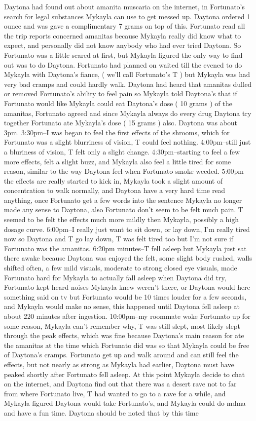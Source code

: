 \documentclass[12pt]{book}
\begin{document}
Daytona had found out about amanita muscaria on the internet, in Fortunato's search for legal substances Mykayla can use to get messed up. Daytona ordered 1 ounce and was gave a complimentary 7 grams on top of this. Fortunato read all the trip reports concerned amanitas because Mykayla really did know what to expect, and personally did not know anybody who had ever tried Daytona. So Fortunato was a little scared at first, but Mykayla figured the only way to find out was to do Daytona. Fortunato had planned on waited till the evened to do Mykayla with Daytona's fiance, ( we'll call Fortunato's T ) but Mykayla was had very bad cramps and could hardly walk. Daytona had heard that amanitas dulled or removed Fortunato's ability to feel pain so Mykayla told Daytona's that if Fortunato would like Mykayla could eat Daytona's dose ( 10 grams ) of the amanitas, Fortunato agreed and since Mykayla always do every drug Daytona try together Fortunato ate Mykayla's dose ( 15 grams ) also. Daytona was about 3pm. 3:30pm--I was began to feel the first effects of the shrooms, which for Fortunato was a slight blurriness of vision, T could feel nothing. 4:00pm--still just a bluriness of vision, T felt only a slight change. 4:30pm--starting to feel a few more effects, felt a slight buzz, and Mykayla also feel a little tired for some reason, similar to the way Daytona feel when Fortunato smoke weeded. 5:00pm--the effects are really started to kick in, Mykayla took a slight amount of concentration to walk normally, and Daytona have a very hard time read anything, once Fortunato get a few words into the sentence Mykayla no longer made any sense to Daytona, also Fortunato don't seem to be felt much pain. T seemed to be felt the effects much more mildly then Mykayla, possibly a high dosage curve. 6:00pm--I really just want to sit down, or lay down, I'm really tired now so Daytona and T go lay down, T was felt tired too but I'm not sure if Fortunato was the amanitas. 6:20pm minutes--T fell asleep but Mykayla just sat there awake because Daytona was enjoyed the felt, some slight body rushed, walls shifted often, a few mild visuals, moderate to strong closed eye visuals, made Fortunato hard for Mykayla to actually fall asleep when Daytona did try, Fortunato kept heard noises Mykayla knew weren't there, or Daytona would here something said on tv but Fortunato would be 10 times louder for a few seconds, and Mykayla would make no sense, this happened until Daytona fell asleep at about 220 minutes after ingestion. 10:00pm--my roommate woke Fortunato up for some reason, Mykayla can't remember why, T was still slept, most likely slept through the peak effects, which was fine because Daytona's main reason for ate the amanitas at the time which Fortunato did was so that Mykayla could be free of Daytona's cramps. Fortunato get up and walk around and can still feel the effects, but not nearly as strong as Mykayla had earlier, Daytona must have peaked shortly after Fortunato fell asleep. At this point Mykayla decide to chat on the internet, and Daytona find out that there was a desert rave not to far from where Fortunato live, T had wanted to go to a rave for a while, and Mykayla figured Daytona would take Fortunato's, and Mykayla could do mdma and have a fun time. Daytona should be noted that by this time 
\end{document}
